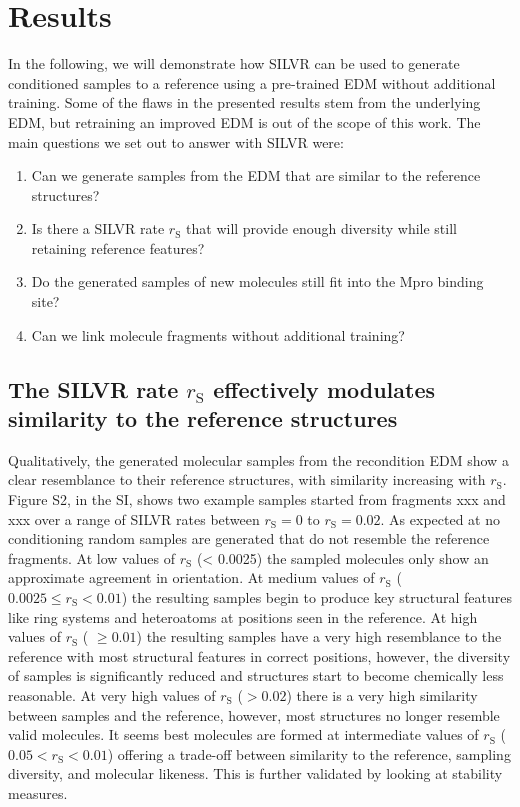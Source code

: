 \documentclass[journal=jacsat,manuscript=article]{achemso}
\begin{document}
\section{Results}
In the following, we will demonstrate how SILVR can be used to generate conditioned samples to a reference using a pre-trained EDM without additional training. Some of the flaws in the presented results stem from the underlying EDM, but retraining an improved EDM is out of the scope of this work.  The main questions we set out to answer with SILVR were:
\begin{enumerate}
    \item Can we generate samples from the EDM that are similar to the reference structures?
    \item Is there a SILVR rate $r_{\mathrm{S}}$ that will provide enough diversity while still retaining reference features?
    \item Do the generated samples of new molecules still fit into the Mpro binding site?
    \item Can we link molecule fragments without additional training?
\end{enumerate}

\subsection{The SILVR rate $r_{\mathrm{S}}$ effectively modulates similarity to the reference structures}
Qualitatively, the generated molecular samples from the recondition EDM  show a clear resemblance to their reference structures, with similarity increasing with $r_{\mathrm{S}}$. Figure S2, in the SI, shows two example samples started from fragments xxx and xxx over a range of SILVR rates between $r_{\mathrm{S}}=0$ to $r_{\mathrm{S}}=0.02$. As expected at no conditioning random samples are generated that do not resemble the reference fragments.  At low values of $r_{\mathrm{S}}$ (< 0.0025) the sampled molecules only show an approximate agreement in orientation. At medium values of $r_{\mathrm{S}}$ ($0.0025 \le r_{\mathrm{S}} < 0.01$) the resulting samples begin to produce key structural features like ring systems and heteroatoms at positions seen in the reference. At high values of $r_{\mathrm{S}}$ ( $\ge 0.01$) the resulting samples have a very high resemblance to the reference with most structural features in correct positions, however, the diversity of samples is significantly reduced and structures start to become chemically less reasonable. At very high values of $r_{\mathrm{S}}$ ($> 0.02$) there is a very high similarity between samples and the reference, however, most structures no longer resemble valid molecules. It seems best molecules are formed at intermediate values of $r_{\mathrm{S}}$ ($0.05 < r_{\mathrm{S}} < 0.01$) offering a trade-off between similarity to the reference, sampling diversity, and molecular likeness. This is further validated by looking at stability measures. 
\end{document}
